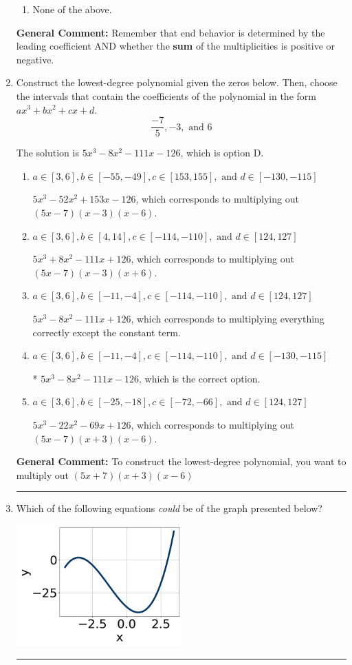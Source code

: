 \documentclass{extbook}[14pt]
\newcommand{\litem}[1]{\item #1

\rule{\textwidth}{0.4pt}}
\begin{document}
\begin{enumerate}
{\begin{enumerate}[label=\Alph*.]
\begin{multicols}{2}
\end{multicols}\item None of the above.\end{enumerate}
\textbf{General Comment:} Remember that end behavior is determined by the leading coefficient AND whether the \textbf{sum} of the multiplicities is positive or negative.
}
\litem{
Construct the lowest-degree polynomial given the zeros below. Then, choose the intervals that contain the coefficients of the polynomial in the form $ax^3+bx^2+cx+d$.
\[ \frac{-7}{5}, -3, \text{ and } 6 \]

The solution is \( 5x^{3} -8 x^{2} -111 x -126 \), which is option D.\begin{enumerate}[label=\Alph*.]
\item \( a \in [3, 6], b \in [-55, -49], c \in [153, 155], \text{ and } d \in [-130, -115] \)

$5x^{3} -52 x^{2} +153 x -126$, which corresponds to multiplying out $(5x -7)(x -3)(x -6)$.
\item \( a \in [3, 6], b \in [4, 14], c \in [-114, -110], \text{ and } d \in [124, 127] \)

$5x^{3} +8 x^{2} -111 x + 126$, which corresponds to multiplying out $(5x -7)(x -3)(x + 6)$.
\item \( a \in [3, 6], b \in [-11, -4], c \in [-114, -110], \text{ and } d \in [124, 127] \)

$5x^{3} -8 x^{2} -111 x + 126$, which corresponds to multiplying everything correctly except the constant term.
\item \( a \in [3, 6], b \in [-11, -4], c \in [-114, -110], \text{ and } d \in [-130, -115] \)

* $5x^{3} -8 x^{2} -111 x -126$, which is the correct option.
\item \( a \in [3, 6], b \in [-25, -18], c \in [-72, -66], \text{ and } d \in [124, 127] \)

$5x^{3} -22 x^{2} -69 x + 126$, which corresponds to multiplying out $(5x -7)(x + 3)(x -6)$.
\end{enumerate}

\textbf{General Comment:} To construct the lowest-degree polynomial, you want to multiply out $(5x + 7)(x + 3)(x -6)$
}
\litem{
Which of the following equations \textit{could} be of the graph presented below?

\begin{center}
    \includegraphics[width=0.5\textwidth]{../Figures/polyGraphToFunctionCopyB.png}
\end{center}




}
\end{enumerate}
\end{document}
